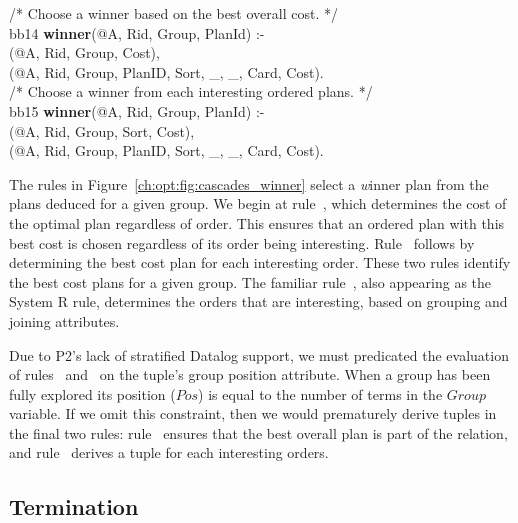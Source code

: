 \begin{figure*}
\begin{boxedminipage}{\linewidth}
/* Choose a winner based on the best overall cost. */ \\
bb14 {\bf winner}(@A, Rid, Group, PlanId) :- \\
(@A, Rid, Group, Cost), \\
(@A, Rid, Group, PlanID, Sort, \_, \_, Card, Cost). \\

/* Choose a winner from each interesting ordered plans. */ \\
bb15 {\bf winner}(@A, Rid, Group, PlanId) :- \\
(@A, Rid, Group, Sort, Cost), \\
(@A, Rid, Group, PlanID, Sort, \_, \_, Card, Cost).

\end{boxedminipage}
\caption{\label{ch:opt:fig:cascades_winner} Cascades winner selection rules.}
\end{figure*}

The rules in Figure~\ref{ch:opt:fig:cascades_winner} select a {\emph winner}
plan from the plans deduced for a given group.  We begin at rule~,
which determines the cost of the optimal plan regardless of order.  This
ensures that an ordered plan with this best cost is chosen regardless of its
order being interesting.  Rule~ follows by determining the best cost
plan for each interesting order.  These two rules identify the best cost plans
for a given group.  The familiar rule~, also appearing as the 
System R rule, determines the orders that are interesting, based on grouping
and joining attributes.

Due to P2's lack of stratified Datalog support, we must predicated the
evaluation of rules~ and~ on the  tuple's group
position attribute.  When a group has been fully explored its 
position ($Pos$) is equal to the number of terms in the $Group$ variable.  If
we omit this constraint, then we would prematurely derive  tuples in
the final two rules: rule~ ensures that the best overall plan is part
of the  relation, and rule~ derives a  tuple for
each interesting orders.

\subsection{Termination}
\label{ch:opt:sec:cascadesend}

